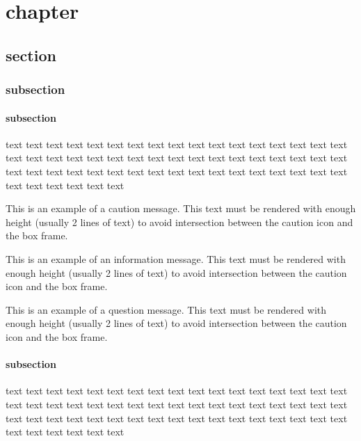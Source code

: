 \documentclass[report, backcover, english, nodocumentinfo]{upmethodology-document}
\begin{document}
	\upmdocumentsummary{}
	\upmdocumentauthors{}
	\upmdocumentvalidators{}
	\upmdocumentinformedpeople{}
	\upmpublicationpage{}
	\tableofcontents{}
	\newpage{}

	\chapter{chapter}
		\section{section}
			\subsection{subsection}
				\subsubsection{subsection}
						text text text text text text text text text text text text text text text text text text text text text text text text text text text text text text text text text text text text text text text text text text text text text text text text text text text text text text text text text
						\begin{upmcaution}
							This is an example of a caution message. This text must be rendered with enough height (usually 2 lines of text) to avoid intersection between the caution icon and the box frame.
						\end{upmcaution}
						\begin{upminfo}
							This is an example of an information message. This text must be rendered with enough height (usually 2 lines of text) to avoid intersection between the caution icon and the box frame.
						\end{upminfo}
						\begin{upmquestion}
							This is an example of a question message. This text must be rendered with enough height (usually 2 lines of text) to avoid intersection between the caution icon and the box frame.
						\end{upmquestion}
				\subsubsection{subsection}
						text text text text text text text text text text text text text text text text text text text text text text text text text text text text text text text text text text text text text text text text text text text text text text text text text text text text text text text text text
\end{document}
